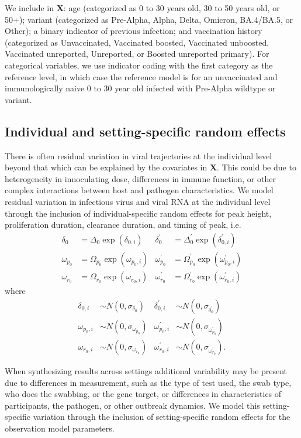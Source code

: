 \documentclass[12pt]{article}
\begin{document}
We include in $\mathbf{X}$: age (categorized as 0 to 30 years old, 30 to 50 years old, or 50+); variant (categorized as Pre-Alpha, Alpha, Delta, Omicron, BA.4/BA.5, or Other); a binary indicator of previous infection; and vaccination history (categorized as Unvaccinated, Vaccinated boosted, Vaccinated unboosted, Vaccinated unreported, Unreported, or Boosted unreported primary). For categorical variables, we use indicator coding with the first category as the reference level, in which case the reference model is for an unvaccinated and immunologically naive 0 to 30 year old infected with Pre-Alpha wildtype or variant.

\subsection{Individual and setting-specific random effects}
There is often residual variation in viral trajectories at the individual level beyond that which can be explained by the covariates in $\mathbf{X}$. This could be due to heterogeneity in innoculating dose, differences in immune function, or other complex interactions between host and pathogen characteristics. We model residual variation in infectious virus and viral RNA at the individual level through the inclusion of individual-specific random effects for peak height, proliferation duration, clearance duration, and timing of peak, i.e. 
\begin{align*}
    \delta_0 &= \Delta_0 \exp(\delta_{0,i}) & \delta^\prime_0 &= \Delta^\prime_0 \exp(\delta^\prime_{0,i}) \\
    \omega_{p_0} &= \Omega_{p_0} \exp( \omega_{p_0,i}) & \omega^\prime_{p_0} &= \Omega^\prime_{p_0} \exp( \omega^\prime_{p_0,i}) \\
    \omega_{r_0}  &= \Omega_{r_0} \exp(\omega_{r_0,i}) & \omega^\prime_{r_0}  &= \Omega^\prime_{r_0} \exp(\omega^\prime_{r_0,i})
\end{align*}
where 
\begin{align*}
\delta_{0,i} &\sim N(0, \sigma_{\delta_0}) & \delta^\prime_{0,i} &\sim N(0, \sigma_{\delta^\prime_0}) \\
\omega_{p_0,i} &\sim N(0, \sigma_{\omega_{p_0}}) & \omega^\prime_{p_0,i} &\sim N(0, \sigma_{\omega^\prime_{p_0}}) \\
\omega_{r_0,i} &\sim N(0, \sigma_{\omega_{r_0}}) & \omega^\prime_{r_0,i} &\sim N(0, \sigma_{\omega^\prime_{r_0}}).
\end{align*}

When synthesizing results across settings additional variability may be present due to differences in measurement, such as the type of test used, the swab type, who does the swabbing, or the gene target, or differences in characteristics of participants, the pathogen, or other outbreak dynamics. We model this setting-specific variation through the inclusion of setting-specific random effects for the observation model parameters. 
\end{document}
